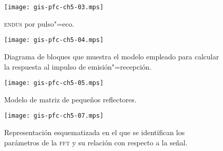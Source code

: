 \documentclass[a4paper,12pt]				{article}
\begin{document}
\begin{figure}
	\begin{center}
		\texttt{[image: gis-pfc-ch5-03.mps]}
	\end{center}
	\caption[\textsc{endus} por pulso"=eco]{\textsc{endus} por
	pulso"=eco.}
	\label{fig:echo}
\end{figure}

\begin{figure}
	\begin{center}
		\texttt{[image: gis-pfc-ch5-04.mps]}
	\end{center}
	\caption[Modelo de emisión"=transmisión]{Diagrama de bloques que
	muestra el modelo empleado para calcular la respuesta al impulso de
	emisión"=recepción.}
	\label{fig:model}
\end{figure}

\clearpage

\begin{figure}
	\begin{center}
		\texttt{[image: gis-pfc-ch5-05.mps]}
	\end{center}
	\caption[Modelo de matriz de pequeños reflectores]{Modelo de matriz
	de pequeños reflectores.}
	\label{fig:matrix}
\end{figure}

\begin{figure}
	\begin{center}
		\texttt{[image: gis-pfc-ch5-07.mps]}
	\end{center}
	\caption[Parámetros del banco de filtros]{Representación
	esquematizada en el que se identifican los parámetros de la
	\textsc{fft} y su relación con respecto a la señal.}
	\label{fig:filter}
\end{figure}

% 
\end{document}
